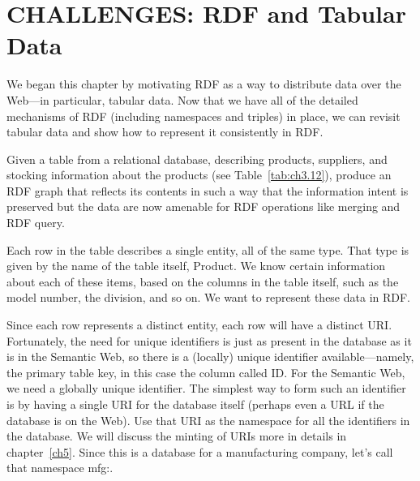 \section{CHALLENGES: RDF and Tabular Data}

We began this chapter by motivating RDF as a way to distribute data over
the Web---in particular, tabular data. Now that we have all of the
detailed mechanisms of RDF (including namespaces and triples) in place,
we can revisit tabular data and show how to represent it consistently in
RDF.

\begin{challenge}
\label{chal:1}

Given a table from a relational database, describing products,
suppliers, and stocking information about the products (see Table~\ref{tab:ch3.12}),
produce an RDF graph that reflects its contents in such a
way that the information intent is preserved but the data are now
amenable for RDF operations like merging and RDF query.

\solution

Each row in the table describes a single entity, all of the same type.
That type is given by the name of the table itself, Product. We know
certain information about each of these items, based on the columns in
the table itself, such as the model number, the division, and so on. We
want to represent these data in RDF.

Since each row represents a distinct entity, each row will have a
distinct URI. Fortunately, the need for unique identifiers is just as present in the database as it is in the
Semantic Web, so there is a (locally) unique identifier
available---namely, the primary table key, in this case the column
called ID. For the Semantic Web, we need a globally unique identifier.
The simplest way to form such an identifier is by having a single URI
for the database itself (perhaps even a URL if the database is on the
Web). Use that URI as the namespace for all the identifiers in the
database. We will discuss the minting of URIs more in details in chapter~\ref{ch5}. 
Since this is a database for a manufacturing company, let's call that
namespace mfg:.


\end{challenge}
